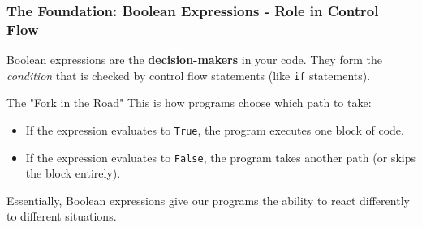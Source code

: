 \documentclass{beamer}
\begin{document}
\begin{frame}[fragile]
    \frametitle{The Foundation: Boolean Expressions - Role in Control Flow}
    
    Boolean expressions are the \textbf{decision-makers} in your code. They form the \textit{condition} that is checked by control flow statements (like \texttt{if} statements).
    
    \vfill
    
    \begin{block}{The "Fork in the Road"}
    This is how programs choose which path to take:
    \begin{itemize}
        \item If the expression evaluates to \texttt{True}, the program executes one block of code.
        \vfill
        \item If the expression evaluates to \texttt{False}, the program takes another path (or skips the block entirely).
    \end{itemize}
    \end{block}
    
    \vfill
    
    Essentially, Boolean expressions give our programs the ability to react differently to different situations.
    
\end{frame}
\end{document}
